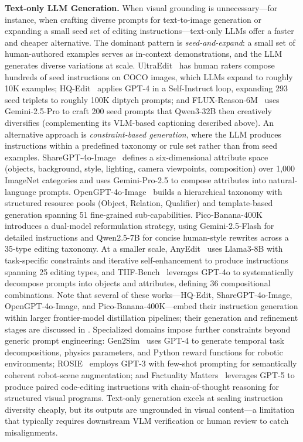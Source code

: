 \documentclass{llmxive}
\begin{document}
\textbf{Text-only LLM Generation.}
When visual grounding is unnecessary---for instance, when crafting diverse prompts for text-to-image generation or expanding a small seed set of editing instructions---text-only LLMs offer a faster and cheaper alternative. The dominant pattern is \emph{seed-and-expand}: a small set of human-authored examples serves as in-context demonstrations, and the LLM generates diverse variations at scale. UltraEdit~\citep{zhao2024ultraedit} has human raters compose hundreds of seed instructions on COCO images, which LLMs expand to roughly 10K examples; HQ-Edit~\citep{hui2024hq} applies GPT-4 in a Self-Instruct loop, expanding 293 seed triplets to roughly 100K diptych prompts; and FLUX-Reason-6M~\citep{fang2025flux} uses Gemini-2.5-Pro to craft 200 seed prompts that Qwen3-32B then creatively diversifies (complementing its VLM-based captioning described above). An alternative approach is \emph{constraint-based generation}, where the LLM produces instructions within a predefined taxonomy or rule set rather than from seed examples. ShareGPT-4o-Image~\citep{chen2025sharegpt} defines a six-dimensional attribute space (objects, background, style, lighting, camera viewpoints, composition) over 1,000 ImageNet categories and uses Gemini-Pro-2.5 to compose attributes into natural-language prompts. OpenGPT-4o-Image~\citep{chen2025opengpt} builds a hierarchical taxonomy with structured resource pools (Object, Relation, Qualifier) and template-based generation spanning 51 fine-grained sub-capabilities. Pico-Banana-400K~\citep{qian2025pico} introduces a dual-model reformulation strategy, using Gemini-2.5-Flash for detailed instructions and Qwen2.5-7B for concise human-style rewrites across a 35-type editing taxonomy. At a smaller scale, AnyEdit~\citep{yu2025anyedit} uses Llama3-8B with task-specific constraints and iterative self-enhancement to produce instructions spanning 25 editing types, and TIIF-Bench~\citep{wei2025tiif} leverages GPT-4o to systematically decompose prompts into objects and attributes, defining 36 compositional combinations. Note that several of these works---HQ-Edit, ShareGPT-4o-Image, OpenGPT-4o-Image, and Pico-Banana-400K---embed their instruction generation within larger frontier-model distillation pipelines; their generation and refinement stages are discussed in . Specialized domains impose further constraints beyond generic prompt engineering: Gen2Sim~\citep{katara2024gen2sim} uses GPT-4 to generate temporal task decompositions, physics parameters, and Python reward functions for robotic environments; ROSIE~\citep{yu2023scaling} employs GPT-3 with few-shot prompting for semantically coherent robot-scene augmentation; and Factuality Matters~\citep{zhuo2025factuality} leverages GPT-5 to produce paired code-editing instructions with chain-of-thought reasoning for structured visual programs. Text-only generation excels at scaling instruction diversity cheaply, but its outputs are ungrounded in visual content---a limitation that typically requires downstream VLM verification or human review to catch misalignments.
\end{document}
